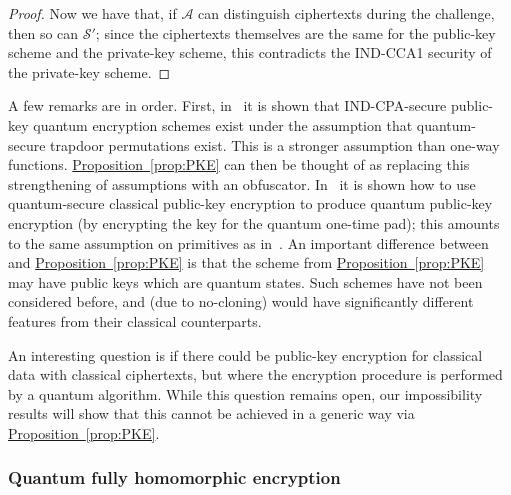 \documentclass[11pt]{article}
\numberwithin{equation}{section}
\newcommand{\expref}[2]{\texorpdfstring{\hyperref[#2]{#1~\ref{#2}}}{#1~\ref{#2}}}
\newcommand{\algo}{\mathcal}
\begin{document}
{\begin{proof}
Now we have that, if $\algo A$ can distinguish ciphertexts during the challenge, then so can $\algo S'$; since the ciphertexts themselves are the same for the public-key scheme and the private-key scheme, this contradicts the IND-CCA1 security of the private-key scheme.
\end{proof}

A few remarks are in order. First, in~\cite{ABFGSS16} it is shown that IND-CPA-secure public-key quantum encryption schemes exist under the assumption that quantum-secure trapdoor permutations exist. This is a stronger assumption than one-way functions. \expref{Proposition}{prop:PKE} can then be thought of as replacing this strengthening of assumptions with an obfuscator. In~\cite{BJ15} it is shown how to use quantum-secure classical public-key encryption to produce quantum public-key encryption (by encrypting the key for the quantum one-time pad); this amounts to the same assumption on primitives as in~\cite{ABFGSS16}. An important difference between~\cite{ABFGSS16, BJ15} and \expref{Proposition}{prop:PKE} is that the scheme from \expref{Proposition}{prop:PKE} may have public keys which are quantum states. Such schemes have not been considered before, and (due to no-cloning) would have significantly different features from their classical counterparts.

An interesting question is if there could be public-key encryption for classical data with classical ciphertexts, but where the encryption procedure is performed by a quantum algorithm. While this question remains open, our impossibility results will show that this cannot be achieved in a generic way via \expref{Proposition}{prop:PKE}.

\subsubsection{Quantum fully homomorphic encryption}

}
\end{document}
